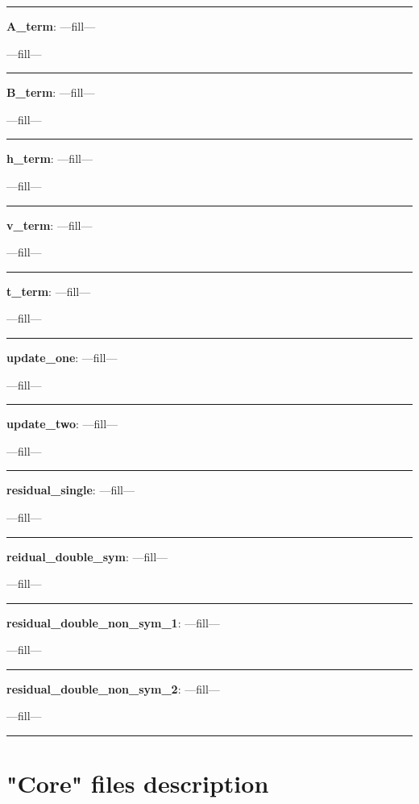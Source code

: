 \documentclass[a4paper,10pt]{article}
\begin{document}
\noindent\rule{\linewidth}{0.4pt}

\textbf{A\_term}: ---fill---

---fill---

\noindent\rule{\linewidth}{0.4pt}

\textbf{B\_term}: ---fill---

---fill---

\noindent\rule{\linewidth}{0.4pt}

\textbf{h\_term}: ---fill---

---fill---

\noindent\rule{\linewidth}{0.4pt}

\textbf{v\_term}: ---fill---

---fill---

\noindent\rule{\linewidth}{0.4pt}

\textbf{t\_term}: ---fill---

---fill---

\noindent\rule{\linewidth}{0.4pt}

\textbf{update\_one}: ---fill---

---fill---

\noindent\rule{\linewidth}{0.4pt}

\textbf{update\_two}: ---fill---

---fill---

\noindent\rule{\linewidth}{0.4pt}

\textbf{residual\_single}: ---fill---

---fill---

\noindent\rule{\linewidth}{0.4pt}

\textbf{reidual\_double\_sym}: ---fill---

---fill---

\noindent\rule{\linewidth}{0.4pt}

\textbf{residual\_double\_non\_sym\_1}: ---fill---

---fill---

\noindent\rule{\linewidth}{0.4pt}

\textbf{residual\_double\_non\_sym\_2}: ---fill---

---fill---

\noindent\rule{\linewidth}{0.4pt}





\section{"Core" files description}
\end{document}
